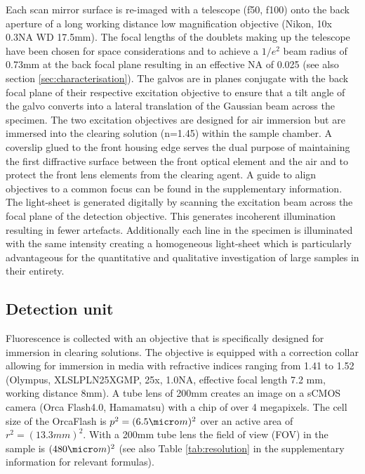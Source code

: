 \documentclass[12pt]{spieman}  %
\begin{document}
\begin{spacing}{2}
Each scan mirror surface is re-imaged with a telescope (f50, f100) onto the back aperture of a long working distance low magnification objective (Nikon, 10x 0.3NA WD 17.5mm). The focal lengths of the doublets making up the telescope have been chosen for space considerations and to achieve a $1/e^2$ beam radius of 0.73mm at the back focal plane resulting in an effective NA of 0.025 (see also section \ref{sec:characterisation}). The galvos are in planes conjugate with the back focal plane of their respective excitation objective to ensure that a tilt angle of the galvo converts into a lateral translation of the Gaussian beam across the specimen. The two excitation objectives are designed for air immersion but are immersed into the clearing solution (n=1.45) within the sample chamber. A coverslip glued to the front housing edge serves the dual purpose of maintaining the first diffractive surface between the front optical element and the air and to protect the front lens elements from the clearing agent. A guide to align objectives to a common focus can be found in the supplementary information. The light-sheet is generated digitally\cite{Keller2008a,Keller2008b} by scanning the excitation beam across the focal plane of the detection objective. This generates incoherent illumination resulting in fewer artefacts. Additionally each line in the specimen is illuminated with the same intensity creating a homogeneous light-sheet which is particularly advantageous for the quantitative and qualitative investigation of large samples in their entirety.

\subsection{Detection unit}
			 
Fluorescence is collected with an objective that is specifically designed for immersion in clearing solutions. The objective is equipped with a correction collar allowing for immersion in media with refractive indices ranging from 1.41 to 1.52 (Olympus, XLSLPLN25XGMP, 25x, 1.0NA, effective focal length 7.2 mm, working distance 8mm). A tube lens of 200mm creates an image on a sCMOS camera (Orca Flash4.0, Hamamatsu) with a chip of over 4 megapixels. The cell size of the OrcaFlash is $p^2= (6.5\micro m)^2$ over an active area of $r^2= (13.3mm)^2$. With a 200mm tube lens the field of view (FOV) in the sample is $(480\micro m)^2$ (see also Table \ref{tab:resolution} in the supplementary information for relevant formulas). 


\end{spacing}
\end{document}
